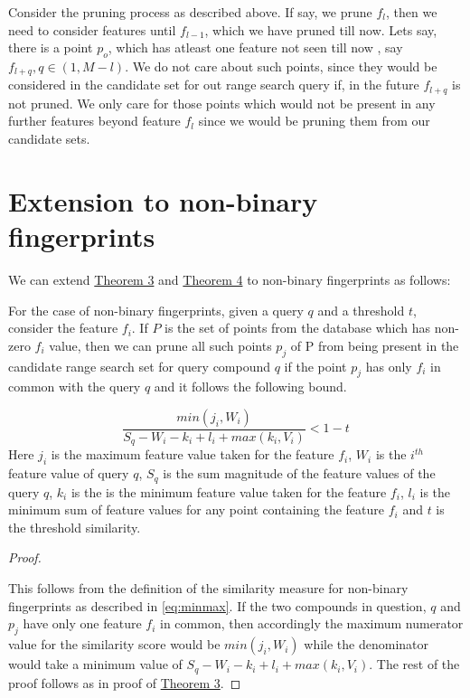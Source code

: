 Consider the pruning process as described above. If say, we prune $f_l$, then we need to consider features until $f_{l-1}$, which we have pruned till now. Lets say, there is a point $p_o$, which has atleast one feature not seen till now , say $f_{l+q}, q\in(1,M-l)$. We do not care about such points, since they would be considered in the candidate set for out range search query if, in the future $f_{l+q}$ is not pruned. We only care for those points which would not be present in any further features beyond feature $f_l$ since we would be pruning them from our candidate sets. 

\section{Extension to non-binary fingerprints}	
\label{sec:prune2}

We can extend \hyperref[thm1bound]{Theorem 3} and \hyperref[thm2bound]{Theorem 4} to non-binary fingerprints as follows:



\begin{thm}
\label{thm3bound}
For the case of non-binary fingerprints, given a query $q$ and a threshold $t$, consider the feature $f_i$. If $P$ is the set of points from the database which has non-zero $f_i$ value, then we can prune all such points $p_j$ of P from being present in the candidate range search set for query compound $q$ if the point $p_j$ has only $f_i$ in common with the query $q$ and it follows the following bound. 

\begin{equation}
\label{eq:boun3}
\frac{min(j_i,W_i)}{S_q - W_i -k_i+ l_i + max (k_i, V_i)}  < 1-t
\end{equation}
Here $j_i$ is the maximum feature value taken for the feature $f_i$,  $W_i$ is the $i^{th}$ feature value of query $q$,  $S_q$ is the sum magnitude of the feature values of the query $q$,  $k_i$ is the is the minimum feature value taken for the feature $f_i$,  $l_i$ is the minimum sum of feature values for any point containing the feature $f_i$ and $t$ is the threshold similarity.
\end{thm}


\begin{proof}
\label{proof3}

This follows from the definition of the similarity measure for non-binary fingerprints as described in \autoref{eq:minmax}. If the two compounds in question, $q$  and $p_j$ have only one feature $f_i$ in common, then accordingly the maximum numerator value for the similarity score would be $min(j_i,W_i)$ while the denominator would take a minimum value of $S_q - W_i -k_i+ l_i + max (k_i, V_i)$. The rest of the proof follows as in proof of \hyperref[thm1bound]{Theorem 3}.

\end{proof}



